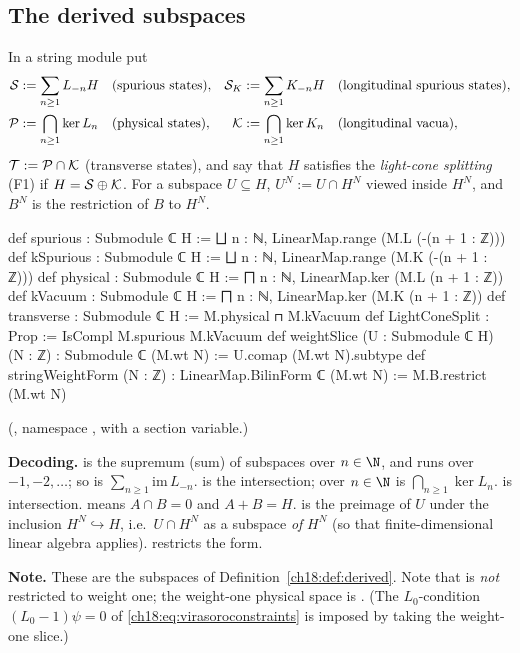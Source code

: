 \subsection{The derived subspaces}

\begin{definition}\label{ch18:def:derived}
In a string module put
\begin{align*}
  \mathcal{S} &:= \sum_{n\ge1}L_{-n}H &&\text{(spurious states)}, &
  \mathcal{S}_K &:= \sum_{n\ge1}K_{-n}H &&\text{(longitudinal spurious states)},\\
  \mathcal{P} &:= \bigcap_{n\ge1}\ker L_n &&\text{(physical states)}, &
  \mathcal{K} &:= \bigcap_{n\ge1}\ker K_n &&\text{(longitudinal vacua)},
\end{align*}
$\mathcal{T}:=\mathcal{P}\cap\mathcal{K}$ (transverse states), and say that $H$ satisfies the \emph{light-cone splitting}
(F1) if $H=\mathcal{S}\oplus\mathcal{K}$.  For a subspace $U\subseteq H$, $U^N:=U\cap H^N$ viewed inside $H^N$, and $B^N$ is
the restriction of $B$ to $H^N$.
\end{definition}

\begin{leancode}
def spurious : Submodule ℂ H := ⨆ n : ℕ, LinearMap.range (M.L (-(n + 1 : ℤ)))
def kSpurious : Submodule ℂ H := ⨆ n : ℕ, LinearMap.range (M.K (-(n + 1 : ℤ)))
def physical : Submodule ℂ H := ⨅ n : ℕ, LinearMap.ker (M.L (n + 1 : ℤ))
def kVacuum : Submodule ℂ H := ⨅ n : ℕ, LinearMap.ker (M.K (n + 1 : ℤ))
def transverse : Submodule ℂ H := M.physical ⊓ M.kVacuum
def LightConeSplit : Prop := IsCompl M.spurious M.kVacuum
def weightSlice (U : Submodule ℂ H) (N : ℤ) : Submodule ℂ (M.wt N) :=
  U.comap (M.wt N).subtype
def stringWeightForm (N : ℤ) : LinearMap.BilinForm ℂ (M.wt N) :=
  M.B.restrict (M.wt N)
\end{leancode}
(, namespace
, with  a section variable.)

\begin{dictionary}
\textbf{Decoding.}   is the supremum (sum) of subspaces over $n\in\N$, and
 runs over $-1,-2,\dots$; so  is $\sum_{n\ge1}\mathrm{im}\,L_{-n}$.
 is the intersection;  over $n\in\N$ is $\bigcap_{n\ge1}\ker L_n$.
 is intersection.   means $A\cap B=0$ and $A+B=H$.   is the preimage of $U$ under the inclusion $H^N\hookrightarrow H$, i.e.\ $U\cap H^N$ as a
subspace \emph{of} $H^N$ (so that finite-dimensional linear algebra applies).  
restricts the form.

\textbf{Note.}  These are the subspaces of Definition~\ref{ch18:def:derived}.  Note that
 is \emph{not} restricted to weight one; the weight-one physical space is
.  (The $L_0$-condition $(L_0-1)\psi=0$ of
\eqref{ch18:eq:virasoroconstraints} is imposed by taking the weight-one slice.)
\end{dictionary}


